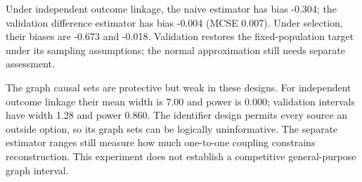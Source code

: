 Under independent outcome linkage, the naive estimator has bias -0.304; the validation difference estimator has bias -0.004 (MCSE 0.007). Under selection, their biases are -0.673 and -0.018. Validation restores the fixed-population target under its sampling assumptions; the normal approximation still needs separate assessment.

The graph causal sets are protective but weak in these designs. For independent outcome linkage their mean width is 7.00 and power is 0.000; validation intervals have width 1.28 and power 0.860. The identifier design permits every source an outside option, so its graph sets can be logically uninformative. The separate estimator ranges still measure how much one-to-one coupling constrains reconstruction. This experiment does not establish a competitive general-purpose graph interval.
